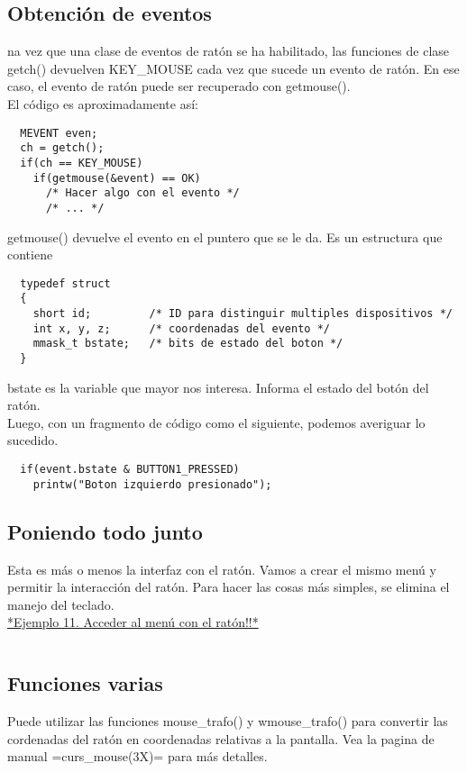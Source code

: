 \documentclass{article}
\begin{document}
\subsection{Obtención de eventos}%
na vez que una clase de eventos de ratón se ha habilitado, las funciones de
clase getch() devuelven KEY\_MOUSE cada vez que sucede un evento de ratón. En
ese caso, el evento de ratón puede ser recuperado con getmouse().\\

El código es aproximadamente así:

\begin{verbatim}
  MEVENT even;
  ch = getch();
  if(ch == KEY_MOUSE)
    if(getmouse(&event) == OK)
      /* Hacer algo con el evento */
      /* ... */
\end{verbatim}

getmouse() devuelve el evento en el puntero que se le da. Es un estructura que contiene

\begin{verbatim}
  typedef struct
  {
    short id;         /* ID para distinguir multiples dispositivos */
    int x, y, z;      /* coordenadas del evento */
    mmask_t bstate;   /* bits de estado del boton */
  }
\end{verbatim}

bstate es la variable que mayor nos interesa. Informa el estado del botón del ratón.\\

Luego, con un fragmento de código como el siguiente, podemos averiguar lo sucedido.

\begin{verbatim}
  if(event.bstate & BUTTON1_PRESSED)
    printw("Boton izquierdo presionado");
\end{verbatim}

\subsection{Poniendo todo junto}%
Esta es más o menos la interfaz con el ratón. Vamos a crear el mismo menú y
permitir la interacción del ratón. Para hacer las cosas más simples, se elimina
el manejo del teclado.\\

\href{https://github.com/nasciiboy/NCURSES-Programming-HOWTO/blob/master/ncurses_programs/basics/mouse_menu.c}{*Ejemplo 11. Acceder al menú con el ratón!!*} 
\inputminted[fontsize=\footnotesize]{cpp}{./cpp/011_menu_raton.cpp}

\subsection{Funciones varias}%
Puede utilizar las funciones mouse\_trafo() y wmouse\_trafo() para convertir las
cordenadas del ratón en coordenadas relativas a la pantalla. Vea la pagina de
manual =curs\_mouse(3X)= para más detalles.\\
\end{document}
